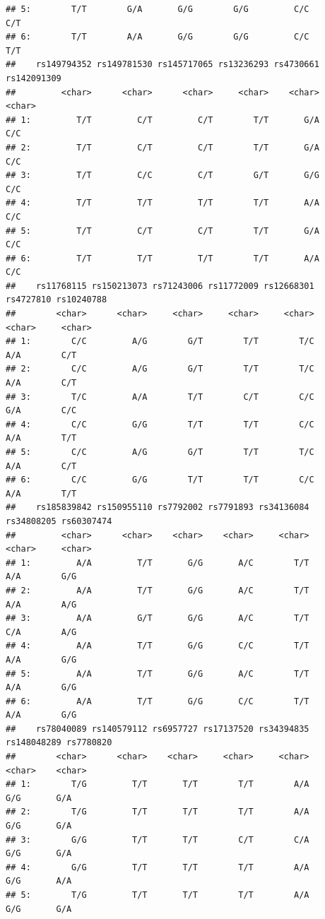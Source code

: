 \documentclass[
]{article}
\begin{document}
\begin{verbatim}
## 5:        T/T        G/A       G/G        G/G         C/C         C/T
## 6:        T/T        A/A       G/G        G/G         C/C         T/T
##    rs149794352 rs149781530 rs145717065 rs13236293 rs4730661 rs142091309
##         <char>      <char>      <char>     <char>    <char>      <char>
## 1:         T/T         C/T         C/T        T/T       G/A         C/C
## 2:         T/T         C/T         C/T        T/T       G/A         C/C
## 3:         T/T         C/C         C/T        G/T       G/G         C/C
## 4:         T/T         T/T         T/T        T/T       A/A         C/C
## 5:         T/T         C/T         C/T        T/T       G/A         C/C
## 6:         T/T         T/T         T/T        T/T       A/A         C/C
##    rs11768115 rs150213073 rs71243006 rs11772009 rs12668301 rs4727810 rs10240788
##        <char>      <char>     <char>     <char>     <char>    <char>     <char>
## 1:        C/C         A/G        G/T        T/T        T/C       A/A        C/T
## 2:        C/C         A/G        G/T        T/T        T/C       A/A        C/T
## 3:        T/C         A/A        T/T        C/T        C/C       G/A        C/C
## 4:        C/C         G/G        T/T        T/T        C/C       A/A        T/T
## 5:        C/C         A/G        G/T        T/T        T/C       A/A        C/T
## 6:        C/C         G/G        T/T        T/T        C/C       A/A        T/T
##    rs185839842 rs150955110 rs7792002 rs7791893 rs34136084 rs34808205 rs60307474
##         <char>      <char>    <char>    <char>     <char>     <char>     <char>
## 1:         A/A         T/T       G/G       A/C        T/T        A/A        G/G
## 2:         A/A         T/T       G/G       A/C        T/T        A/A        A/G
## 3:         A/A         G/T       G/G       A/C        T/T        C/A        A/G
## 4:         A/A         T/T       G/G       C/C        T/T        A/A        G/G
## 5:         A/A         T/T       G/G       A/C        T/T        A/A        G/G
## 6:         A/A         T/T       G/G       C/C        T/T        A/A        G/G
##    rs78040089 rs140579112 rs6957727 rs17137520 rs34394835 rs148048289 rs7780820
##        <char>      <char>    <char>     <char>     <char>      <char>    <char>
## 1:        T/G         T/T       T/T        T/T        A/A         G/G       G/A
## 2:        T/G         T/T       T/T        T/T        A/A         G/G       G/A
## 3:        G/G         T/T       T/T        C/T        C/A         G/G       G/A
## 4:        G/G         T/T       T/T        T/T        A/A         G/G       A/A
## 5:        T/G         T/T       T/T        T/T        A/A         G/G       G/A

\end{verbatim}
\end{document}
